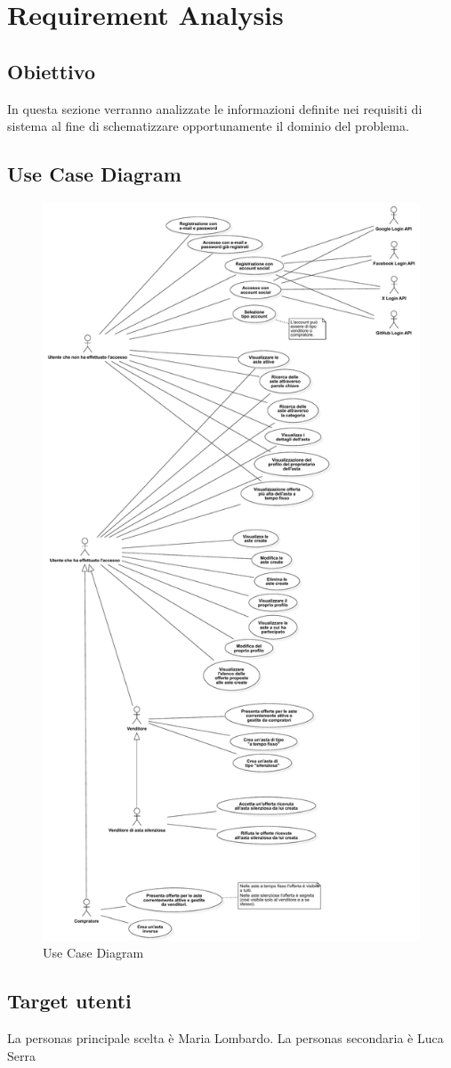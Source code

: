 
\chapter{Requirement Analysis}
    \section{Obiettivo}
        In questa sezione verranno analizzate le informazioni definite nei requisiti di sistema al fine di schematizzare opportunamente il dominio del problema.

    \section{Use Case Diagram}
        \begin{figure}[htbp!]
            \centering
                \vspace{2\baselineskip}
                \includegraphics[width=0.42\linewidth]{Immagini/Diagrammi/UseCaseDiagram.pdf}
            \caption{Use Case Diagram}
            \label{fig:Use Case Diagram}
        \end{figure}

    \newpage
    
    \section{Target utenti}
        La personas principale scelta è Maria Lombardo. La personas secondaria è Luca Serra
        
